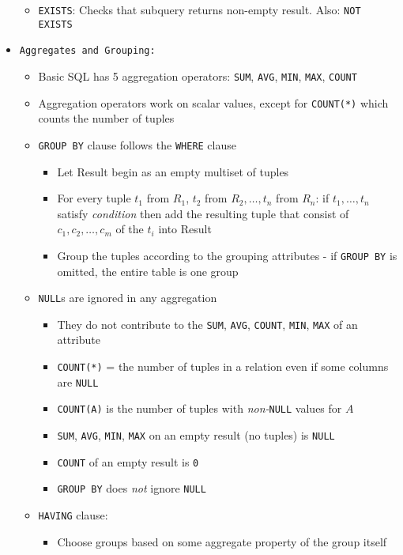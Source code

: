 \documentclass[landscape,8pt]{extarticle}
\newcommand{\code}{\lstinline}
\begin{document}
\begin{multicols}{4}
\begin{itemize}
\begin{itemize}
        \item \code{EXISTS}: Checks that subquery returns non-empty result. Also: \code{NOT EXISTS}
    \end{itemize}
    \item \code{Aggregates and Grouping:}
    \begin{itemize}
    \item Basic SQL has 5 aggregation operators: \code{SUM}, \code{AVG}, \code{MIN}, \code{MAX}, \code{COUNT}
    \item Aggregation operators work on scalar values, except for \code{COUNT(*)} which counts the
    number of tuples
    \item \code{GROUP BY} clause follows the \code{WHERE} clause
    \begin{itemize}
        \item Let Result begin as an empty multiset of tuples
        \item For every tuple $t_1$ from $R_1$, $t_2$ from $R_2, \ldots, t_n$ from $R_n$: if $t_1,
        \ldots, t_n$ satisfy \emph{condition} then add the resulting tuple that consist of $c_1,
        c_2, \ldots, c_m$ of the $t_i$ into Result
        \item Group the tuples according to the grouping attributes - if \code{GROUP BY} is omitted,
        the entire table is one group
    \end{itemize}
    \item \code{NULL}s are ignored in any aggregation
    \begin{itemize}
        \item They do not contribute to the \code{SUM}, \code{AVG}, \code{COUNT}, \code{MIN},
        \code{MAX} of an attribute
        \item \code{COUNT(*)} = the number of tuples in a relation even if some columns are \code{NULL}
        \item \code{COUNT(A)} is the number of tuples with \emph{non-}\code{NULL} values for $A$
        \item \code{SUM}, \code{AVG}, \code{MIN}, \code{MAX} on an empty result (no tuples) is \code{NULL}
        \item \code{COUNT} of an empty result is \code{0}
        \item \code{GROUP BY} does \emph{not} ignore \code{NULL}
    \end{itemize}
    \item \code{HAVING} clause:
    \begin{itemize}
        \item Choose groups based on some aggregate property of the group itself

\end{itemize}
\end{itemize}
\end{itemize}
\end{multicols}
\end{document}
